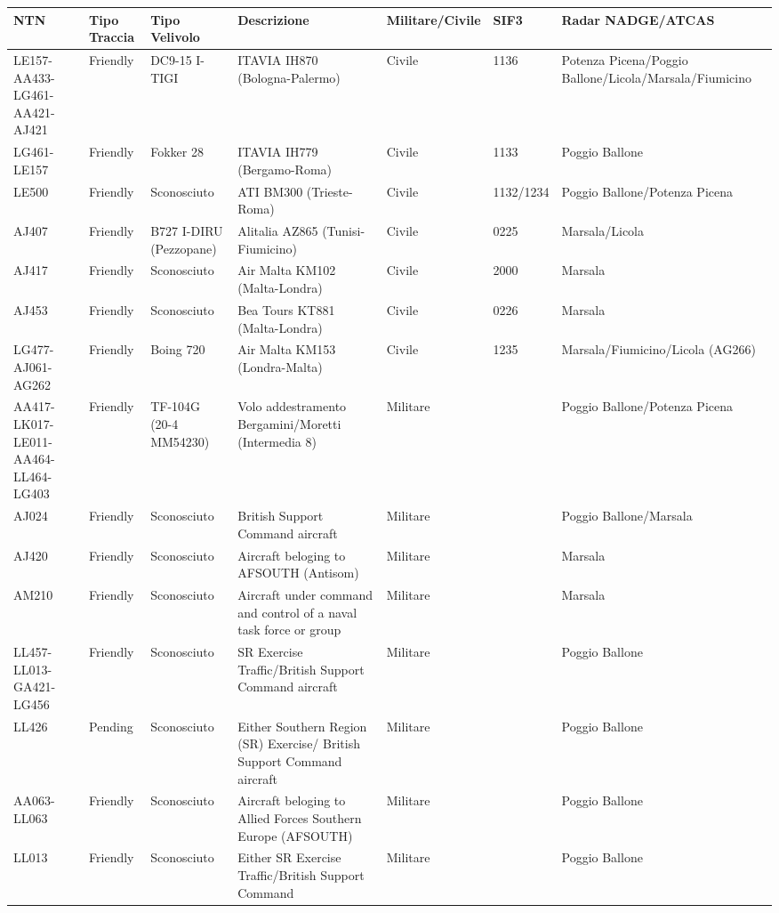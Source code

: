 \documentclass[
]{article}
\author{}
\date{}
\begin{document}
\begin{longtable}[]{@{}lllllll@{}}
\toprule
NTN & Tipo Traccia & Tipo Velivolo & Descrizione & Militare/Civile &
SIF3 & Radar NADGE/ATCAS \\
\midrule
\endhead
LE157-AA433-LG461-AA421-AJ421 & Friendly & DC9-15 I-TIGI & ITAVIA IH870
(Bologna-Palermo) & Civile & 1136 & Potenza Picena/Poggio
Ballone/Licola/Marsala/Fiumicino \\
LG461-LE157 & Friendly & Fokker 28 & ITAVIA IH779 (Bergamo-Roma) &
Civile & 1133 & Poggio Ballone \\
LE500 & Friendly & Sconosciuto & ATI BM300 (Trieste-Roma) & Civile &
1132/1234 & Poggio Ballone/Potenza Picena \\
AJ407 & Friendly & B727 I-DIRU (Pezzopane) & Alitalia AZ865
(Tunisi-Fiumicino) & Civile & 0225 & Marsala/Licola \\
AJ417 & Friendly & Sconosciuto & Air Malta KM102 (Malta-Londra) & Civile
& 2000 & Marsala \\
AJ453 & Friendly & Sconosciuto & Bea Tours KT881 (Malta-Londra) & Civile
& 0226 & Marsala \\
LG477-AJ061-AG262 & Friendly & Boing 720 & Air Malta KM153
(Londra-Malta) & Civile & 1235 & Marsala/Fiumicino/Licola (AG266) \\
AA417-LK017-LE011-AA464-LL464-LG403 & Friendly & TF-104G (20-4 MM54230)
& Volo addestramento Bergamini/Moretti (Intermedia 8) & Militare & &
Poggio Ballone/Potenza Picena \\
AJ024 & Friendly & Sconosciuto & British Support Command aircraft &
Militare & & Poggio Ballone/Marsala \\
AJ420 & Friendly & Sconosciuto & Aircraft beloging to AFSOUTH (Antisom)
& Militare & & Marsala \\
AM210 & Friendly & Sconosciuto & Aircraft under command and control of a
naval task force or group & Militare & & Marsala \\
LL457-LL013-GA421-LG456 & Friendly & Sconosciuto & SR Exercise
Traffic/British Support Command aircraft & Militare & & Poggio
Ballone \\
LL426 & Pending & Sconosciuto & Either Southern Region (SR) Exercise/
British Support Command aircraft & Militare & & Poggio Ballone \\
AA063-LL063 & Friendly & Sconosciuto & Aircraft beloging to Allied
Forces Southern Europe (AFSOUTH) & Militare & & Poggio Ballone \\
LL013 & Friendly & Sconosciuto & Either SR Exercise Traffic/British
Support Command & Militare & & Poggio Ballone \\

\end{longtable}
\end{document}
